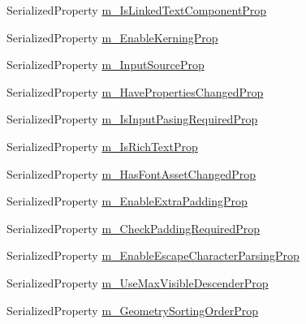 \begin{DoxyCompactItemize}
\item 
Serialized\+Property \mbox{\hyperlink{class_t_m_pro_1_1_editor_utilities_1_1_t_m_p___base_editor_panel_a900bd0386264af2c45536ac4afa1962c}{m\+\_\+\+Is\+Linked\+Text\+Component\+Prop}}
\item 
Serialized\+Property \mbox{\hyperlink{class_t_m_pro_1_1_editor_utilities_1_1_t_m_p___base_editor_panel_a76731ba9285eafde60f3c2159282b58f}{m\+\_\+\+Enable\+Kerning\+Prop}}
\item 
Serialized\+Property \mbox{\hyperlink{class_t_m_pro_1_1_editor_utilities_1_1_t_m_p___base_editor_panel_a3982a37cb58bb2ec22e2be2a3b8bcdc1}{m\+\_\+\+Input\+Source\+Prop}}
\item 
Serialized\+Property \mbox{\hyperlink{class_t_m_pro_1_1_editor_utilities_1_1_t_m_p___base_editor_panel_a2c76801e4ef19ba03053af8f897113d3}{m\+\_\+\+Have\+Properties\+Changed\+Prop}}
\item 
Serialized\+Property \mbox{\hyperlink{class_t_m_pro_1_1_editor_utilities_1_1_t_m_p___base_editor_panel_ade8ad3aad452ad23124cb7f3dbbe1cb3}{m\+\_\+\+Is\+Input\+Pasing\+Required\+Prop}}
\item 
Serialized\+Property \mbox{\hyperlink{class_t_m_pro_1_1_editor_utilities_1_1_t_m_p___base_editor_panel_ac5c489231295b98f56d186af75d55966}{m\+\_\+\+Is\+Rich\+Text\+Prop}}
\item 
Serialized\+Property \mbox{\hyperlink{class_t_m_pro_1_1_editor_utilities_1_1_t_m_p___base_editor_panel_a9a6df6cfff8ac4c92ab427166d94e3eb}{m\+\_\+\+Has\+Font\+Asset\+Changed\+Prop}}
\item 
Serialized\+Property \mbox{\hyperlink{class_t_m_pro_1_1_editor_utilities_1_1_t_m_p___base_editor_panel_a2cf41c32435fd580b17d4821d7578c68}{m\+\_\+\+Enable\+Extra\+Padding\+Prop}}
\item 
Serialized\+Property \mbox{\hyperlink{class_t_m_pro_1_1_editor_utilities_1_1_t_m_p___base_editor_panel_aa1b00d196a10d6e01638990a1cde9c8b}{m\+\_\+\+Check\+Padding\+Required\+Prop}}
\item 
Serialized\+Property \mbox{\hyperlink{class_t_m_pro_1_1_editor_utilities_1_1_t_m_p___base_editor_panel_ae21c49aaac5fe9c64537f1ea263abd14}{m\+\_\+\+Enable\+Escape\+Character\+Parsing\+Prop}}
\item 
Serialized\+Property \mbox{\hyperlink{class_t_m_pro_1_1_editor_utilities_1_1_t_m_p___base_editor_panel_a0c95b91b57e32bb1bf7ddb768d9619da}{m\+\_\+\+Use\+Max\+Visible\+Descender\+Prop}}
\item 
Serialized\+Property \mbox{\hyperlink{class_t_m_pro_1_1_editor_utilities_1_1_t_m_p___base_editor_panel_a814f634e9080977ec1ad2014375b1410}{m\+\_\+\+Geometry\+Sorting\+Order\+Prop}}

\end{DoxyCompactItemize}
